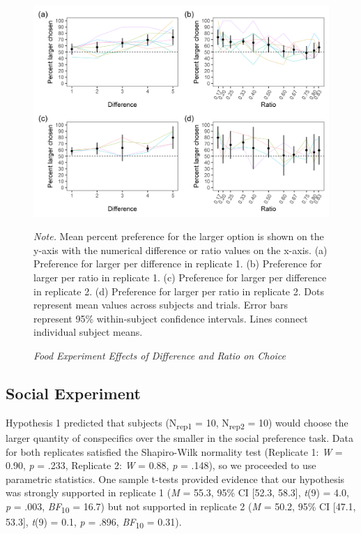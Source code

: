 \documentclass[
  ,pub,floatsintext]{apa6}
\begin{document}
\begin{figure}[t]
\caption{\newline \emph{Food Experiment Effects of Difference and Ratio on Choice} \label{fig:foodgraphs}}
\begin{center}
\includegraphics[width=\linewidth]{"figures/food_figure.png"}
\end{center}

\textit{Note.} Mean percent preference for the larger option is shown on the y-axis with the numerical difference or ratio values on the x-axis. (a) Preference for larger per difference in replicate 1.  (b) Preference for larger per ratio in replicate 1. (c) Preference for larger per difference in replicate 2. (d) Preference for larger per ratio in replicate 2. Dots represent mean values across subjects and trials. Error bars represent 95\% within-subject confidence intervals. Lines connect individual subject means.
\end{figure}

\hypertarget{social-experiment-1}{%
\subsection{Social Experiment}\label{social-experiment-1}}

Hypothesis 1 predicted that subjects (N\textsubscript{rep1} = 10, N\textsubscript{rep2} = 10) would choose the larger quantity of conspecifics over the smaller in the social preference task. Data for both replicates satisfied the Shapiro-Wilk normality test (Replicate 1: \emph{W} = 0.90, \emph{p} = .233, Replicate 2: \emph{W} = 0.88, \emph{p} = .148), so we proceeded to use parametric statistics. One sample t-tests provided evidence that our hypothesis was strongly supported in replicate 1 (\emph{M} = 55.3, 95\% CI {[}52.3, 58.3{]}, \emph{t}(9) = 4.0, \emph{p} = .003, \emph{BF}\textsubscript{10} = 16.7) but not supported in replicate 2 (\emph{M} = 50.2, 95\% CI {[}47.1, 53.3{]}, \emph{t}(9) = 0.1, \emph{p} = .896, \emph{BF}\textsubscript{10} = 0.31).
\end{document}
